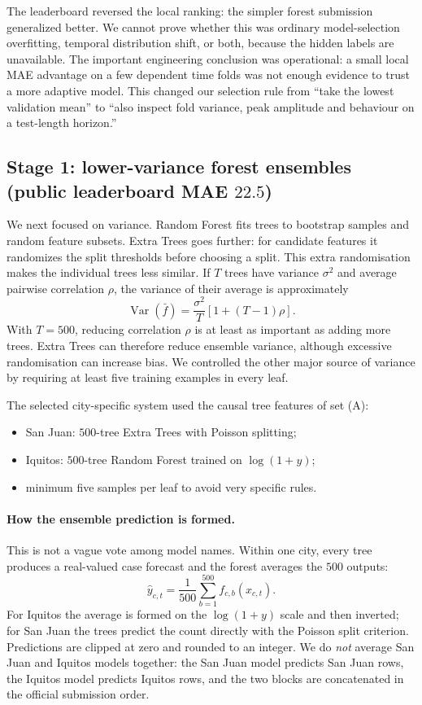 \documentclass[11pt,a4paper]{article}
\begin{document}
The leaderboard reversed the local ranking: the simpler forest submission generalized better. We cannot prove whether this was ordinary model-selection overfitting, temporal distribution shift, or both, because the hidden labels are unavailable. The important engineering conclusion was operational: a small local MAE advantage on a few dependent time folds was not enough evidence to trust a more adaptive model. This changed our selection rule from ``take the lowest validation mean'' to ``also inspect fold variance, peak amplitude and behaviour on a test-length horizon.''

\subsection{Stage 1: lower-variance forest ensembles (public leaderboard MAE $22.5$)}
\label{sec:foreststage}
We next focused on variance. Random Forest fits trees to bootstrap samples and random feature subsets. Extra Trees goes further: for candidate features it randomizes the split thresholds before choosing a split. This extra randomisation makes the individual trees less similar. If $T$ trees have variance $\sigma^2$ and average pairwise correlation $\rho$, the variance of their average is approximately
\begin{equation}
\operatorname{Var}(\bar f) = \frac{\sigma^2}{T}\left[1+(T-1)\rho\right].
\end{equation}
With $T=500$, reducing correlation $\rho$ is at least as important as adding more trees. Extra Trees can therefore reduce ensemble variance, although excessive randomisation can increase bias. We controlled the other major source of variance by requiring at least five training examples in every leaf.

The selected city-specific system used the causal tree features of set (A):
\begin{itemize}
  \item San Juan: $500$-tree Extra Trees \cite{extratrees} with Poisson splitting;
  \item Iquitos: $500$-tree Random Forest trained on $\log(1+y)$;
  \item minimum five samples per leaf to avoid very specific rules.
\end{itemize}

\paragraph{How the ensemble prediction is formed.} This is not a vague vote among model names. Within one city, every tree produces a real-valued case forecast and the forest averages the $500$ outputs:
\begin{equation}
\hat y_{c,t}=\frac{1}{500}\sum_{b=1}^{500} f_{c,b}(x_{c,t}).
\end{equation}
For Iquitos the average is formed on the $\log(1+y)$ scale and then inverted; for San Juan the trees predict the count directly with the Poisson split criterion. Predictions are clipped at zero and rounded to an integer. We do \emph{not} average San Juan and Iquitos models together: the San Juan model predicts San Juan rows, the Iquitos model predicts Iquitos rows, and the two blocks are concatenated in the official submission order.
\end{document}
